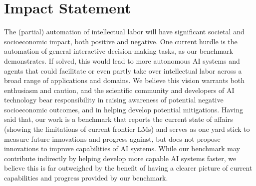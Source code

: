 \section*{Impact Statement}

The (partial) automation of intellectual labor will have significant societal and socioeconomic impact, both positive and negative.
One current hurdle is the automation of general interactive decision-making tasks, as our benchmark demonstrates.
If solved, this would lead to more autonomous AI systems and agents that could facilitate or even partly take over intellectual labor across a broad range of applications and domains.
We believe this vision warrants both enthusiasm and caution, and the scientific community and developers of AI technology bear responsibility in raising awareness of potential negative socioeconomic outcomes, and in helping develop potential mitigations. 
Having said that, our work is a benchmark that reports the current state of affairs (showing the limitations of current frontier LMs) and serves as one yard stick to measure future innovations and progress against, but does not propose innovations to improve capabilities of AI systems.
While our benchmark may contribute indirectly by helping develop more capable AI systems faster, we believe this is far outweighed by the benefit of having a clearer picture of current capabilities and progress provided by our benchmark.

